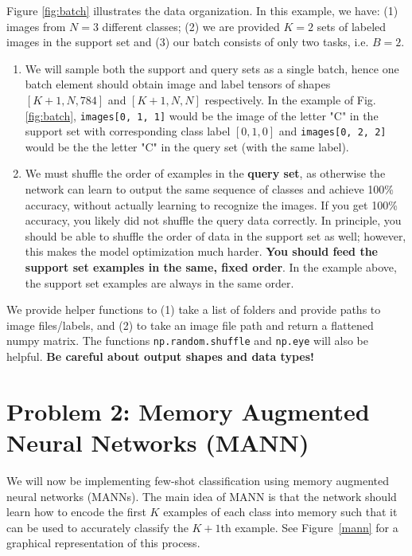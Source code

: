 \documentclass[12pt]{article}
\begin{document}
    Figure \ref{fig:batch} illustrates the data organization. In this example, we have: (1) images from $N=3$ different classes; (2) we are provided $K=2$ sets of labeled images in the support set and (3) our batch consists of only two tasks, i.e. $B=2$.
    \begin{enumerate}
        \item We will sample both the support and query sets as a single batch, hence one batch element should obtain image and label tensors of shapes $[K+1, N, 784]$  and $[K+1, N, N]$ respectively. In the example of Fig. \ref{fig:batch}, \texttt{images[0, 1, 1]} would be the image of the letter "C" in the support set with corresponding class label $[0, 1, 0]$ and \texttt{images[0, 2, 2]} would be the the letter "C" in the query set (with the same label).

        \item We must shuffle the order of examples in the \textbf{query set}, as otherwise the network can learn to output the same sequence of classes and achieve 100\% accuracy, without actually learning to recognize the images. If you get 100\% accuracy, you likely did not shuffle the query data correctly. In principle, you should be able to shuffle the order of data in the support set as well; however, this makes the model optimization much harder. \textbf{You should feed the support set examples in the same, fixed order}. In the example above, the support set examples are always in the same order.

    \end{enumerate}

    \noindent We provide helper functions to (1) take a list of folders and provide paths to image files/labels, and (2) to take an image file path and return a flattened numpy matrix. The functions \texttt{np.random.shuffle} and \texttt{np.eye} will also be helpful. \textbf{Be careful about output shapes and data types!}




    \section*{Problem 2: Memory Augmented Neural Networks (MANN)     \cite{pmlr-v48-santoro16,DBLP:journals/corr/MishraRCA17}}

    We will now be implementing few-shot classification using memory augmented neural networks (MANNs). The main idea of MANN is that the network should learn how to encode the first $K$ examples of each class into memory such that it can be used to accurately classify the $K+1$th example. See Figure~\ref{mann} for a graphical representation of this process.
\end{document}

